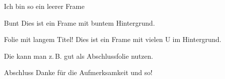 \documentclass[german,10pt,compress,aspectratio=169]{beamer}
\begin{document}
\begin{frame}[plain]{}{}%
	Ich bin so ein leerer Frame
\end{frame}

\begin{frame}[coloredbackground]{Bunt}
	Dies ist ein Frame mit buntem Hintergrund.
\end{frame}

\begin{frame}{Folie mit langem Titel!}
	Dies ist ein Frame mit vielen U im Hintergrund.

	Die kann man z.\,B. gut als Abschlussfolie nutzen.
\end{frame}
\begin{frame}{Abschluss}
	Danke für die Aufmerksamkeit und so!
\end{frame}
\end{document}

